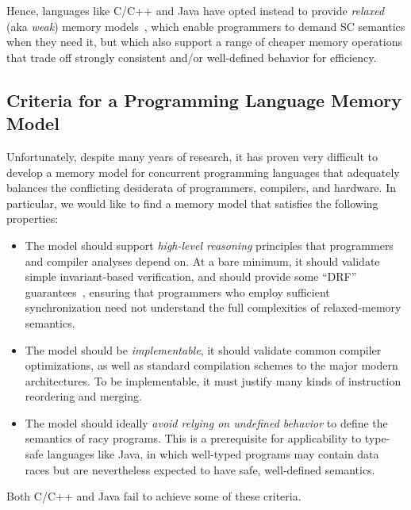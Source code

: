 Hence, languages like C/C++ and Java have opted instead to provide
\emph{relaxed} (aka \emph{weak}) memory models~\cite{jmm,cppstandard},
which enable programmers to demand SC semantics when they need it, but
which also support a range of cheaper memory operations that trade off
strongly consistent and/or well-defined behavior for efficiency.

\subsection{Criteria for a Programming Language Memory Model}
\label{sec:criteria}

Unfortunately, despite many years of research, it has proven very
difficult to develop a memory model for concurrent programming
languages that adequately balances the conflicting desiderata of
programmers, compilers, and hardware.  In particular, we would like to
find a memory model that satisfies the following properties:
\vspace{-.5ex}
\begin{itemize}
\item The model should support \emph{high-level reasoning} principles
  that programmers and compiler analyses depend on.  At a bare
  minimum, it should validate simple invariant-based verification, and
  should provide some ``DRF'' guarantees~\cite{Adve:1990}, ensuring that
  programmers who employ sufficient synchronization need not understand
  the full complexities of relaxed-memory semantics.\\[-2.5ex]
\item The model should be \emph{implementable}, \ie it should validate
  common compiler optimizations, as well as standard compilation
  schemes to the major modern architectures.  To be implementable, it
  must justify many kinds of instruction reordering and merging.\\[-2.5ex]
\item The model should ideally \emph{avoid relying on undefined
    behavior} to define the semantics of racy programs.  This is a
  prerequisite for applicability to type-safe languages like Java, in
  which well-typed programs may contain data races but are
  nevertheless expected to have safe, well-defined semantics.
\end{itemize}
\vspace{-.5ex}
\mbox{}\indent Both C/C++ and Java fail to achieve some of these criteria.

